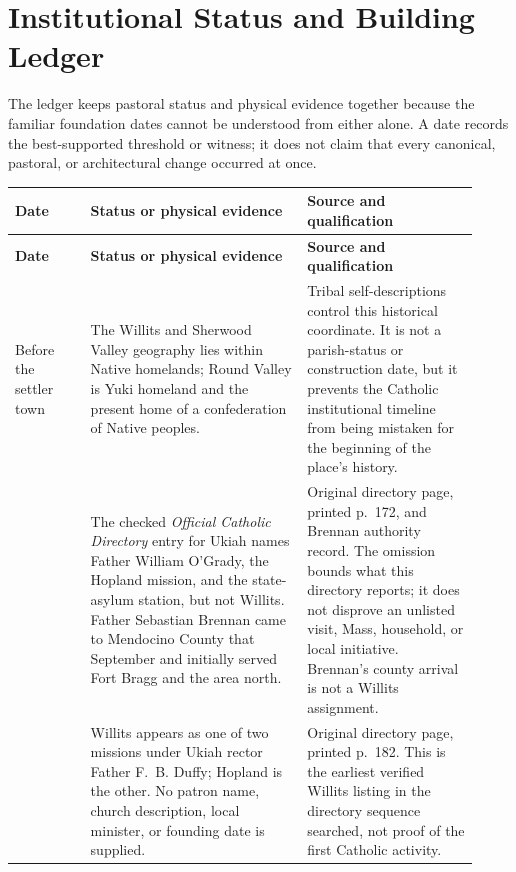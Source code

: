 \section{Institutional Status and Building Ledger}

The ledger keeps pastoral status and physical evidence together because the familiar foundation dates cannot be understood from either alone. A date records the best-supported threshold or witness; it does not claim that every canonical, pastoral, or architectural change occurred at once.

\begin{longtable}{>{\bfseries\RaggedRight\arraybackslash}p{0.15\linewidth}>{\RaggedRight\arraybackslash}p{0.43\linewidth}>{\RaggedRight\arraybackslash}p{0.34\linewidth}}
\toprule
\textbf{Date} & \textbf{Status or physical evidence} & \textbf{Source and qualification}\\
\midrule
\endfirsthead
\toprule
\textbf{Date} & \textbf{Status or physical evidence} & \textbf{Source and qualification}\\
\midrule
\endhead
\bottomrule
\endfoot

Before the settler town & The Willits and Sherwood Valley geography lies within Native homelands; Round Valley is Yuki homeland and the present home of a confederation of Native peoples. & Tribal self-descriptions control this historical coordinate. It is not a parish-status or construction date, but it prevents the Catholic institutional timeline from being mistaken for the beginning of the place's history.\\

1903 & The checked \emph{Official Catholic Directory} entry for Ukiah names Father William O'Grady, the Hopland mission, and the state-asylum station, but not Willits. Father Sebastian Brennan came to Mendocino County that September and initially served Fort Bragg and the area north. & Original directory page, printed p.~172, and Brennan authority record. The omission bounds what this directory reports; it does not disprove an unlisted visit, Mass, household, or local initiative. Brennan's county arrival is not a Willits assignment.\\

1906 & Willits appears as one of two missions under Ukiah rector Father F.~B. Duffy; Hopland is the other. No patron name, church description, local minister, or founding date is supplied. & Original directory page, printed p.~182. This is the earliest verified Willits listing in the directory sequence searched, not proof of the first Catholic activity.\\


\end{longtable}
